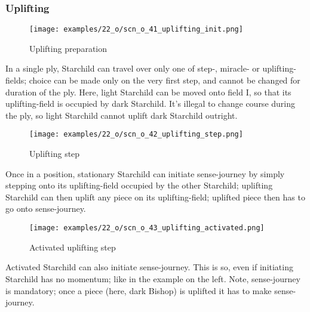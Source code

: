 \vspace*{1.3\baselineskip}

\subsubsection*{Uplifting}
\label{sec:One/Starchild/Sense-journey/Uplifting}

\vspace*{-0.9\baselineskip}
\noindent
\begin{wrapfigure}[9]{l}{0.4\textwidth}
\centering
\texttt{[image: examples/22\_o/scn\_o\_41\_uplifting\_init.png]}
\vspace*{-0.4\baselineskip}
\caption{Uplifting preparation}
\label{fig:scn_o_41_uplifting_init}
\end{wrapfigure}
In a single ply, Starchild can travel over only one of step-, miracle- or uplifting-fields;
choice can be made only on the very first step, and cannot be changed for duration of the
ply. \newline
\indent
Here, light Starchild can be moved onto field I, so that its uplifting-field is occupied
by dark Starchild. It's illegal to change course during the ply, so light Starchild cannot
uplift dark Starchild outright.

\clearpage %

\vspace*{-2.1\baselineskip}
\noindent
\begin{wrapfigure}[8]{l}{0.4\textwidth}
\centering
\texttt{[image: examples/22\_o/scn\_o\_42\_uplifting\_step.png]}
\vspace*{-0.4\baselineskip}
\caption{Uplifting step}
\label{fig:scn_o_42_uplifting_step}
\end{wrapfigure}
Once in a position, stationary Starchild can initiate sense-journey by simply stepping
onto its uplifting-field occupied by the other Starchild; uplifting Starchild can then
uplift any piece on its uplifting-field; uplifted piece then has to go onto sense-journey.

\vspace*{-0.4\baselineskip}

\noindent
\begin{wrapfigure}[8]{l}{0.4\textwidth}
\centering
\texttt{[image: examples/22\_o/scn\_o\_43\_uplifting\_activated.png]}
\vspace*{-0.4\baselineskip}
\caption{Activated uplifting step}
\label{fig:scn_o_43_uplifting_activated}
\end{wrapfigure}
Activated Starchild can also initiate sense-journey. This is so, even if initiating
Starchild has no momentum; like in the example on the left. \newline
\indent
Note, sense-journey is mandatory; once a piece (here, dark Bishop) is uplifted it has
to make sense-journey.


